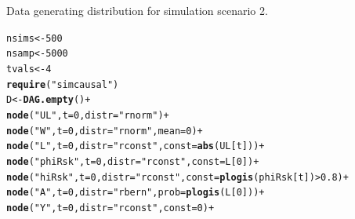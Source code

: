 \documentclass{article}\usepackage[]{graphicx}\usepackage[]{color}
\makeatletter
\newcommand{\hlnum}[1]{\textcolor[rgb]{0.686,0.059,0.569}{#1}}%
\newcommand{\hlstr}[1]{\textcolor[rgb]{0.192,0.494,0.8}{#1}}%
\newcommand{\hlopt}[1]{\textcolor[rgb]{0,0,0}{#1}}%
\newcommand{\hlstd}[1]{\textcolor[rgb]{0.345,0.345,0.345}{#1}}%
\newcommand{\hlkwb}[1]{\textcolor[rgb]{0.69,0.353,0.396}{#1}}%
\newcommand{\hlkwc}[1]{\textcolor[rgb]{0.333,0.667,0.333}{#1}}%
\newcommand{\hlkwd}[1]{\textcolor[rgb]{0.737,0.353,0.396}{\textbf{#1}}}%
\newenvironment{kframe}{%
 \def\at@end@of@kframe{}%
 \ifinner\ifhmode%
  \def\at@end@of@kframe{\end{minipage}}%
  \begin{minipage}{\columnwidth}%
 \fi\fi%
 \def\FrameCommand##1{\hskip\@totalleftmargin \hskip-\fboxsep
 \colorbox{shadecolor}{##1}\hskip-\fboxsep
     \hskip-\linewidth \hskip-\@totalleftmargin \hskip\columnwidth}%
 \MakeFramed {\advance\hsize-\width
   \@totalleftmargin\z@ \linewidth\hsize
   \@setminipage}}%
 {\par\unskip\endMakeFramed%
 \at@end@of@kframe}
\newenvironment{knitrout}{}{} %
\makeatother
\begin{document}
\clearpage

Data generating distribution for simulation scenario 2.

\begin{knitrout}
\color{fgcolor}\begin{kframe}
\begin{alltt}
\hlstd{nsims} \hlkwb{<-} \hlnum{500}
\hlstd{nsamp} \hlkwb{<-} \hlnum{5000}
\hlstd{tvals} \hlkwb{<-} \hlnum{4}
\hlkwd{require}\hlstd{(}\hlstr{"simcausal"}\hlstd{)}
\hlstd{D} \hlkwb{<-} \hlkwd{DAG.empty}\hlstd{()} \hlopt{+}
    \hlkwd{node}\hlstd{(}\hlstr{"UL"}\hlstd{,}    \hlkwc{t} \hlstd{=} \hlnum{0}\hlstd{,} \hlkwc{distr} \hlstd{=} \hlstr{"rnorm"}\hlstd{)} \hlopt{+}
    \hlkwd{node}\hlstd{(}\hlstr{"W"}\hlstd{,}     \hlkwc{t} \hlstd{=} \hlnum{0}\hlstd{,} \hlkwc{distr} \hlstd{=} \hlstr{"rnorm"}\hlstd{,} \hlkwc{mean} \hlstd{=} \hlnum{0}\hlstd{)} \hlopt{+}
    \hlkwd{node}\hlstd{(}\hlstr{"L"}\hlstd{,}     \hlkwc{t} \hlstd{=} \hlnum{0}\hlstd{,} \hlkwc{distr} \hlstd{=} \hlstr{"rconst"}\hlstd{,} \hlkwc{const} \hlstd{=} \hlkwd{abs}\hlstd{(UL[t]))} \hlopt{+}
    \hlkwd{node}\hlstd{(}\hlstr{"phiRsk"}\hlstd{,} \hlkwc{t} \hlstd{=} \hlnum{0}\hlstd{,} \hlkwc{distr} \hlstd{=} \hlstr{"rconst"}\hlstd{,} \hlkwc{const} \hlstd{= L[}\hlnum{0}\hlstd{])} \hlopt{+}
    \hlkwd{node}\hlstd{(}\hlstr{"hiRsk"}\hlstd{,} \hlkwc{t} \hlstd{=} \hlnum{0}\hlstd{,} \hlkwc{distr} \hlstd{=} \hlstr{"rconst"}\hlstd{,} \hlkwc{const} \hlstd{=} \hlkwd{plogis}\hlstd{(phiRsk[t])} \hlopt{>} \hlnum{0.8}\hlstd{)} \hlopt{+}
    \hlkwd{node}\hlstd{(}\hlstr{"A"}\hlstd{,}     \hlkwc{t} \hlstd{=} \hlnum{0}\hlstd{,} \hlkwc{distr} \hlstd{=} \hlstr{"rbern"}\hlstd{,} \hlkwc{prob} \hlstd{=} \hlkwd{plogis}\hlstd{(L[}\hlnum{0}\hlstd{]))} \hlopt{+}
    \hlkwd{node}\hlstd{(}\hlstr{"Y"}\hlstd{,}     \hlkwc{t} \hlstd{=} \hlnum{0}\hlstd{,} \hlkwc{distr} \hlstd{=} \hlstr{"rconst"}\hlstd{,} \hlkwc{const} \hlstd{=} \hlnum{0}\hlstd{)} \hlopt{+}


\end{alltt}
\end{kframe}
\end{knitrout}
\end{document}

